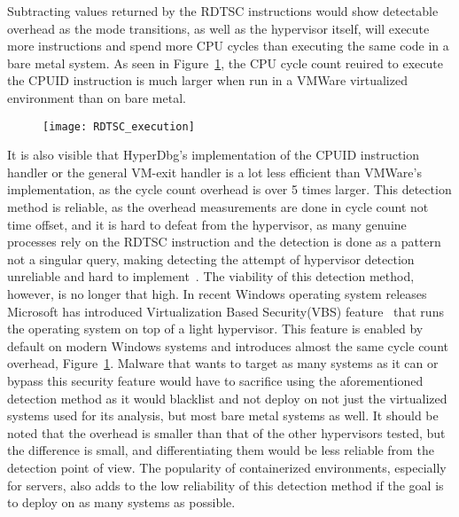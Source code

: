 Subtracting values returned by the RDTSC instructions would show detectable overhead as the mode transitions, as well as the hypervisor itself, will execute more instructions and spend more CPU cycles than executing the same code in a bare metal system. 
As seen in Figure~\ref{fig:rdtsc_overhead}, the CPU cycle count reuired to execute the CPUID instruction is much larger when run in a VMWare virtualized environment than on bare metal. 
\begin{figure}[tbh]
    \texttt{[image: RDTSC\_execution]} %
    \label{fig:rdtsc_overhead}
\end{figure}

It is also visible that HyperDbg's implementation of the CPUID instruction handler or the general VM-exit handler is a lot less efficient than VMWare's implementation, as the cycle count overhead is over 5 times larger. 
This detection method is reliable, as the overhead measurements are done in cycle count not time offset, and it is hard to defeat from the hypervisor, as many genuine processes rely on the RDTSC 
instruction and the detection is done as a pattern not a singular query, making detecting the attempt of hypervisor detection unreliable and hard to implement~\cite{hypervisor-detection-timing-attacks}. 
The viability of this detection method, however, is no longer that high. In recent Windows operating system releases Microsoft has introduced Virtualization Based Security(VBS) feature~\cite{windows-vbs} 
that runs the operating system on top of a light hypervisor. This feature is enabled by default on modern Windows systems and introduces almost the same cycle count overhead, Figure~\ref{fig:rdtsc_overhead}. 
Malware that wants to target as many systems as it can or bypass this security feature would have to sacrifice using the aforementioned detection method as it would blacklist and not deploy on not just the virtualized systems used for its analysis, 
but most bare metal systems as well. It should be noted that the overhead is smaller than that of the other hypervisors tested, but the difference is small, and differentiating them would be less reliable from the detection point of view.
The popularity of containerized environments, especially for servers, also adds to the low reliability of this detection method if the goal is to deploy on as many systems as possible.

